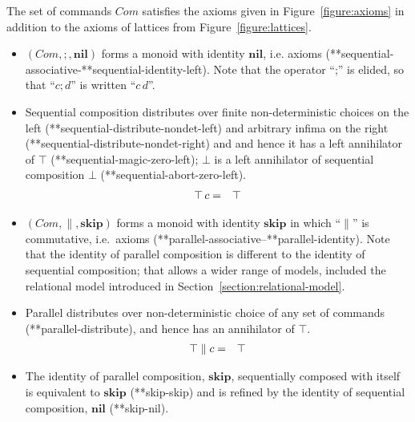 \documentclass[fleqn]{fac}
\makeatletter
\def\refaxiom{\@ifnextchar*{\@refaxiom}{\@@refaxiom}}
\def\@refaxiom*#1{\ref{axiom-#1}\index{Axiom!#1|LawUse}}
\def\@@refaxiom#1{axiom~(\ref{axiom-#1})\index{Axiom!#1|LawUse}}
\newcommand{\labelproperty}[1]{\label{property-#1}\index{Property!#1|PropertyDef{\ref{property-#1}}}}
\def\refproperty{\@ifnextchar*{\@refproperty}{\@@refproperty}}
\def\@refproperty*#1{\ref{property-#1}\index{Property!#1|LawUse}}
\def\@@refproperty#1{property~(\ref{property-#1})\index{Property!#1|LawUse}}
\newcommand{\Seq}{\mathbin{;}}
\newcommand{\SSeq}{\,}
\newcommand{\Nil}{\Keyword{nil}}
\newcommand{\Command}{\mathit{Com}}
\newcommand{\Keyword}[1]{\mathsf{\mathbf{#1}}}
\newcommand{\Magic}{\Keyword{\top}}
\newcommand{\Abort}{\Keyword{\bot}}
\newcommand{\Skip}{\Keyword{skip}}
\makeatother
\begin{document}
 
\begin{definitionx}
The set of commands $\Command$ satisfies the axioms given in Figure~\ref{figure:axioms}
in addition to the axioms of lattices from Figure~\ref{figure:lattices}.
\end{definitionx}
\begin{itemize}
\item
$(\Command, \Seq\,, \Nil)$ forms a monoid with identity $\Nil$, i.e. axioms (\refaxiom*{sequential-associative}-\refaxiom*{sequential-identity-left}).
Note that the operator ``$\Seq$'' is elided, so that ``$c \Seq d$'' is written ``$c \SSeq d$''. 
\item
Sequential composition distributes over finite non-deterministic choices on the left (\refaxiom*{sequential-distribute-nondet-left}) 
and arbitrary infima on the right (\refaxiom*{sequential-distribute-nondet-right}) and 
and hence it has a left annihilator of  $\Magic$ (\refproperty*{sequential-magic-zero-left});
$\Abort$ is a left annihilator of sequential composition $\Abort$ (\refaxiom*{sequential-abort-zero-left}). 
 \begin{eqnarray}
  \Magic \SSeq c & = & \Magic  \labelproperty{sequential-magic-zero-left}
 \end{eqnarray}
\item
$(\Command, \parallel, \Skip)$ forms a monoid with identity $\Skip$ in which ``$\parallel$'' is commutative, i.e.\ axioms 
(\refaxiom*{parallel-associative}--\refaxiom*{parallel-identity}).
Note that the identity of parallel composition is different to the identity of sequential composition;
that allows a wider range of models, included the relational model introduced in Section~\ref{section:relational-model}.
\item
Parallel distributes over non-deterministic choice of any set of commands
(\refaxiom*{parallel-distribute}),
and hence 
has an annihilator of $\Magic$.
\begin{eqnarray}
  \Magic \parallel c & = & \Magic  \labelproperty{parallel-top-zero}
\end{eqnarray}
\item
The identity of parallel composition, $\Skip$, sequentially composed with itself is equivalent to $\Skip$ (\refaxiom*{skip-skip})
and is refined by the identity of sequential composition, $\Nil$ (\refaxiom*{skip-nil}).


\end{itemize}
\end{document}
